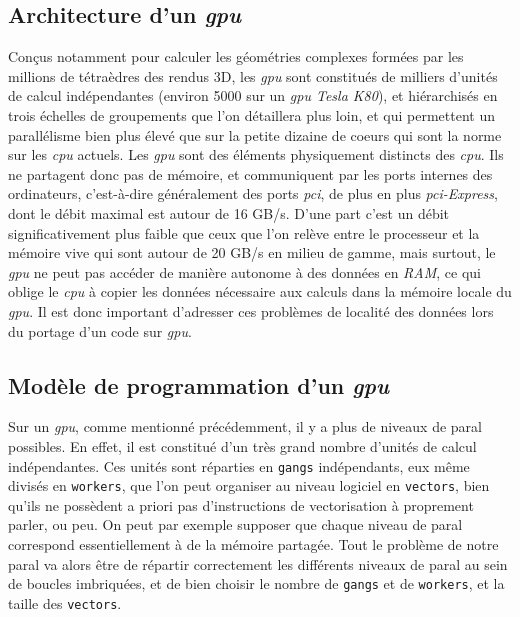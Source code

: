 \documentclass{article}
\begin{document}
\subsection{Architecture d'un \textit{\gls{gpu}}}

Conçus notamment pour calculer les géométries complexes formées par les millions de tétraèdres des rendus 3D, les \textit{\gls{gpu}} sont constitués de milliers d'unités de calcul indépendantes (environ 5000 sur un \textit{\gls{gpu} Tesla K80}), et hiérarchisés en trois échelles de groupements que l'on détaillera plus loin, et qui permettent un parallélisme bien plus élevé que sur la petite dizaine de \gls{coeur}s qui sont la norme sur les \textit{\gls{cpu}} actuels.
Les \textit{\gls{gpu}} sont des éléments physiquement distincts des \textit{\gls{cpu}}. Ils ne partagent donc pas de mémoire, et communiquent par les ports internes des ordinateurs, c'est-à-dire généralement des ports \textit{\gls{pci}}, de plus en plus \textit{\gls{pci}-Express}, dont le débit maximal est autour de 16 GB/s. D'une part c'est un débit significativement plus faible que ceux que l'on relève entre le processeur et la mémoire vive qui sont autour de 20 GB/s en milieu de gamme, mais surtout, le \textit{\gls{gpu}} ne peut pas accéder de manière autonome à des données en \textit{RAM}, ce qui oblige le \textit{\gls{cpu}} à copier les données nécessaire aux calculs dans la mémoire locale du \textit{\gls{gpu}}. Il est donc important d'adresser ces problèmes de localité des données lors du portage d'un code sur \textit{\gls{gpu}}.


\subsection{Modèle de programmation d'un \textit{\gls{gpu}}}

Sur un \textit{\gls{gpu}}, comme mentionné précédemment, il y a plus de niveaux de \gls{paral} possibles. En effet, il est constitué d'un très grand nombre d'unités de calcul indépendantes. Ces unités sont réparties en \texttt{gangs} indépendants, eux même divisés en \texttt{workers}, que l'on peut organiser au niveau logiciel en \texttt{vectors}, bien qu'ils ne possèdent a priori pas d'instructions de vectorisation à proprement parler, ou peu. On peut par exemple supposer que chaque niveau de \gls{paral} correspond essentiellement à de la mémoire partagée. Tout le problème de notre \gls{paral} va alors être de répartir correctement les différents niveaux de \gls{paral} au sein de boucles imbriquées, et de bien choisir le nombre de \texttt{gangs} et de \texttt{workers}, et la taille des \texttt{vectors}.
\end{document}
